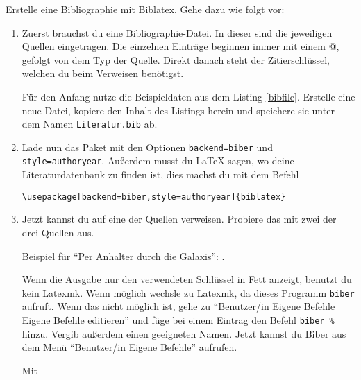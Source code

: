 \item Erstelle eine Bibliographie mit Biblatex. Gehe dazu wie folgt vor:
	\begin{figure}[bp!]
	
	\end{figure}
    \begin{enumerate}
        \item Zuerst brauchst du eine Bibliographie-Datei. In dieser sind die 
            jeweiligen Quellen eingetragen. Die einzelnen Einträge beginnen immer
            mit einem @, gefolgt von dem Typ der Quelle. Direkt danach steht der
            Zitierschlüssel, welchen du beim Verweisen benötigst.
        
            Für den Anfang nutze die Beispieldaten aus dem Listing \ref{bibfile}.
            Erstelle eine neue Datei, kopiere den Inhalt des Listings herein und
            speichere sie unter dem Namen \texttt{Literatur.bib} ab.
        
        \item Lade nun das Paket  mit den Optionen
            \texttt{backend=biber} und \texttt{style=authoryear}. Außerdem musst
            du \LaTeX{} sagen, wo deine Literaturdatenbank zu finden ist, dies
            machst du mit dem Befehl 
            \begin{loesung}
                \begin{verbatim}
\usepackage[backend=biber,style=authoryear]{biblatex}

                \end{verbatim}
            \end{loesung}
        
        \item Jetzt kannst du auf eine der Quellen verweisen. Probiere das mit
            zwei der drei Quellen aus.
            \begin{hinweis}
                Beispiel für \enquote{Per Anhalter durch die Galaxis}:
                \cite{Adam2004}.
            
                Wenn die Ausgabe nur den verwendeten Schlüssel in Fett anzeigt,
                benutzt du kein Latexmk. Wenn möglich wechsle zu Latexmk, da
                dieses Programm \texttt{biber} aufruft. Wenn das nicht möglich ist,
                gehe zu \enquote{Benutzer/in \textrightarrow{} Eigene Befehle
                \textrightarrow{} Eigene Befehle editieren} und füge bei einem
                Eintrag den Befehl \verb|biber %| hinzu. Vergib außerdem einen
                geeigneten Namen. Jetzt kannst du Biber aus dem Menü
                \enquote{Benutzer/in \textrightarrow{} Eigene Befehle} aufrufen.
            \end{hinweis}
            \begin{loesung}
                Mit 
            \end{loesung}
        

\end{enumerate}

